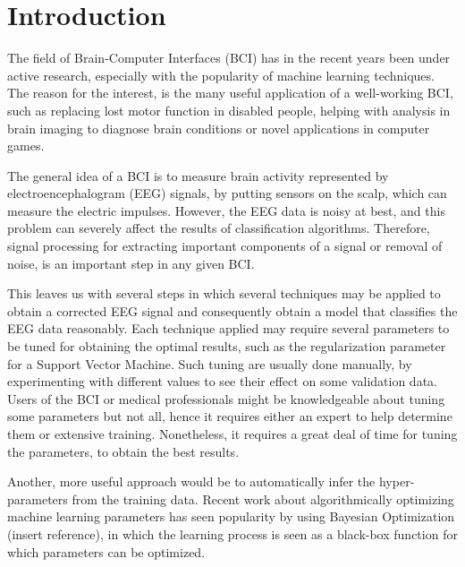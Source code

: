 \section{Introduction}
The field of Brain-Computer Interfaces (BCI) has in the recent years been under active research, especially with the popularity of machine learning techniques. The reason for the interest, is the many useful application of a well-working BCI, such as replacing lost motor function in disabled people, helping with analysis in brain imaging to diagnose brain conditions or novel applications in computer games. 

The general idea of a BCI is to measure brain activity represented by electroencephalogram (EEG) signals, by putting sensors on the scalp, which can measure the electric impulses. However, the EEG data is noisy at best, and this problem can severely affect the results of classification algorithms. Therefore, signal processing for extracting important components of a signal or removal of noise, is an important step in any given BCI.

This leaves us with several steps in which several techniques may be applied to obtain a corrected EEG signal and consequently obtain a model that classifies the EEG data reasonably. Each technique applied may require several parameters to be tuned for obtaining the optimal results, such as the regularization parameter for a Support Vector Machine. Such tuning are usually done manually, by experimenting with different values to see their effect on some validation data. Users of the BCI or medical professionals might be knowledgeable about tuning some parameters but not all, hence it requires either an expert to help determine them or extensive training. Nonetheless, it requires a great deal of time for tuning the parameters, to obtain the best results.

Another, more useful approach would be to automatically infer the hyper-parameters from the training data. Recent work about algorithmically optimizing machine learning parameters has seen popularity by using Bayesian Optimization (insert reference), in which the learning process is seen as a black-box function for which parameters can be optimized.

